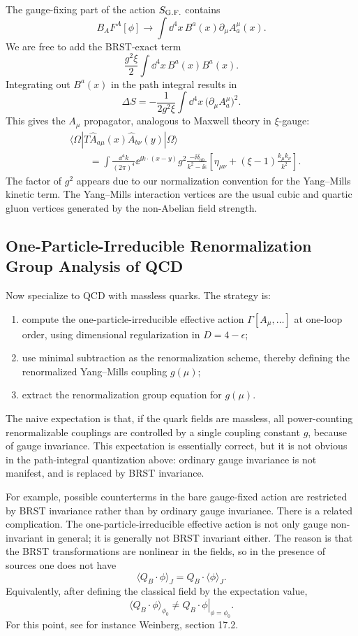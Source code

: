 The gauge-fixing part of the action \(S_{\rm G.F.}\) contains
\[
  B_A F^A[\phi]
  \longrightarrow
  \int\dd^4x\,B^a(x)\partial_\mu A_a^\mu(x).
\]
We are free to add the BRST-exact term
\[
  \frac{g^2\xi}{2}\int\dd^4x\,B^a(x)B^a(x).
\]
Integrating out \(B^a(x)\) in the path integral results in
\[
  \Delta S
  =
  -\frac{1}{2g^2\xi}
  \int\dd^4x\,\bigl(\partial_\mu A_a^\mu\bigr)^2.
\]
This gives the \(A_\mu\) propagator, analogous to Maxwell theory in
\(\xi\)-gauge:
\[
\begin{aligned}
  &\langle\Omega|
  T\widehat A_{a\mu}(x)\widehat A_{b\nu}(y)
  |\Omega\rangle
\\
  &\qquad =
  \int\frac{\dd^4k}{(2\pi)^4}
  \ee^{\ii k\cdot(x-y)}
  g^2
  \frac{-\ii\delta_{ab}}{k^2-\ii\epsilon}
  \left[
    \eta_{\mu\nu}
    +(\xi-1)\frac{k_\mu k_\nu}{k^2}
  \right].
\end{aligned}
\]
The factor of \(g^2\) appears due to our normalization convention for the
Yang--Mills kinetic term.  The Yang--Mills interaction vertices are the
usual cubic and quartic gluon vertices generated by the non-Abelian field
strength.


\subsection{One-Particle-Irreducible Renormalization Group Analysis of QCD}

Now specialize to QCD with massless quarks.  The strategy is:
\begin{enumerate}
  \item compute the one-particle-irreducible effective action
    \(\Gamma[A_\mu,\ldots]\) at one-loop order, using dimensional
    regularization in \(D=4-\epsilon\);
  \item use minimal subtraction as the renormalization scheme, thereby
    defining the renormalized Yang--Mills coupling \(g(\mu)\);
  \item extract the renormalization group equation for \(g(\mu)\).
\end{enumerate}

The naive expectation is that, if the quark fields are massless, all
power-counting renormalizable couplings are controlled by a single
coupling constant \(g\), because of gauge invariance.  This expectation is
essentially correct, but it is not obvious in the path-integral
quantization above: ordinary gauge invariance is not manifest, and is
replaced by BRST invariance.

For example, possible counterterms in the bare gauge-fixed action are
restricted by BRST invariance rather than by ordinary gauge invariance.
There is a related complication.  The one-particle-irreducible effective
action is not only gauge non-invariant in general; it is generally not
BRST invariant either.  The reason is that the BRST transformations are
nonlinear in the fields, so in the presence of sources one does not have
\[
  \bigl\langle Q_B\cdot\phi\bigr\rangle_J
  =
  Q_B\cdot\langle\phi\rangle_J .
\]
Equivalently, after defining the classical field by the expectation value,
\[
  \bigl\langle Q_B\cdot\phi\bigr\rangle_{\phi_0}
  \ne
  \left. Q_B\cdot\phi\right|_{\phi=\phi_0}.
\]
For this point, see for instance Weinberg, section 17.2.

